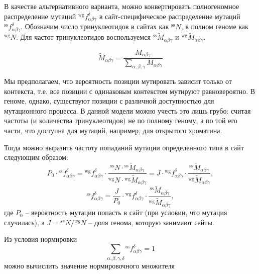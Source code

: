 \documentclass[a4paper]{article}
\begin{document}
В качестве альтернативного варианта, можно конвертировать полногеномное распределение мутаций ${}^{\textrm{wg}}f_{\alpha\beta\gamma}^{\delta}$ в сайт-специфическое распределение мутаций ${}^{\textrm{ss}}f_{\alpha\beta\gamma}^{\delta}$. Обозначим число тринуклеотидов в сайтах как ${}^{\textrm{ss}}N$, в полном геноме как ${}^{\textrm{wg}}N$. Для частот тринуклеотидов воспользуемся ${}^{\textrm{ss}}\widetilde{M}_{\alpha\beta\gamma}$ и ${}^{\textrm{wg}}\widetilde{M}_{\alpha\beta\gamma}$.

$$\widetilde{M}_{\alpha\beta\gamma} = \frac{M_{\alpha\beta\gamma}}{\sum_{\alpha,\beta,\gamma}M_{\alpha\beta\gamma}}$$

Мы предполагаем, что вероятность позиции мутировать зависит только от контекста, т.е. все позиции с одинаковым контекстом мутируют равновероятно. В геноме, однако, существуют позиции с различной доступностью для мутационного процесса. В данной модели можно учесть это лишь грубо: считая частоты (и количества тринуклеотидов) не по полному геному, а по той его части, что доступна для мутаций, например, для открытого хроматина.

Тогда можно выразить частоту попаданий мутации определенного типа в сайт следующим образом:
\begin{equation*}
P_0\cdot{}^{\textrm{ss}}f_{\alpha\beta\gamma}^{\delta} = {}^{\textrm{wg}}f_{\alpha\beta\gamma}^{\delta} \cdot \frac{{}^{\textrm{ss}}N \cdot {}^{\textrm{ss}}\widetilde{M}_{\alpha\beta\gamma}}{{}^{\textrm{wg}}N \cdot {}^{\textrm{wg}}\widetilde{M}_{\alpha\beta\gamma}} = J\cdot{}^{\textrm{wg}}f_{\alpha\beta\gamma}^{\delta} \cdot\frac{{}^{\textrm{ss}}\widetilde{M}_{\alpha\beta\gamma}}{{}^{\textrm{wg}}\widetilde{M}_{\alpha\beta\gamma}},
\end{equation*}
\begin{equation*}
{}^{\textrm{ss}}f_{\alpha\beta\gamma}^{\delta} = \frac{J}{P_0}\cdot{}^{\textrm{wg}}f_{\alpha\beta\gamma}^{\delta} \cdot\frac{{}^{\textrm{ss}}\widetilde{M}_{\alpha\beta\gamma}}{{}^{\textrm{wg}}\widetilde{M}_{\alpha\beta\gamma}},
\end{equation*}
где $P_0$ -- вероятность мутации попасть в сайт (при условии, что мутация случилась), а $J={}^{ss}N / {}^{wg}N$ -- доля генома, которую занимают сайты.

Из условия нормировки
\begin{equation*}
\sum_{\alpha,\beta,\gamma,\delta}{}^{\textrm{ss}}f_{\alpha\beta\gamma}^{\delta} = 1
\end{equation*}
можно вычислить значение нормировочного множителя
\end{document}
